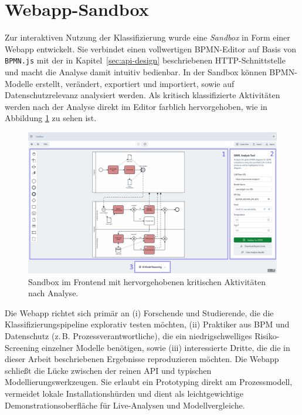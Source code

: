 \section{Webapp-Sandbox}\label{sec:nutzung-uber-webapp}

Zur interaktiven Nutzung der Klassifizierung wurde eine \emph{Sandbox} in Form einer Webapp entwickelt. Sie verbindet einen vollwertigen \ac{BPMN}-Editor auf Basis von \texttt{BPMN.js} \cite{bpmn-js} mit der in Kapitel~\ref{sec:api-design} beschriebenen HTTP-Schnittstelle und macht die Analyse damit intuitiv bedienbar. In der Sandbox können \ac{BPMN}-Modelle erstellt, verändert, exportiert und importiert, sowie auf Datenschutzrelevanz analysiert werden. Als kritisch klassifizierte Aktivitäten werden nach der Analyse direkt im Editor farblich hervorgehoben, wie in Abbildung \ref{fig:sandbox-frontend-analyzed-model} zu sehen ist.

\begin{figure}[h]
    \centering
    \includegraphics[width=\linewidth]{images/sandbox/sandbox-analyzed-model-annotated}
    \caption{Sandbox im Frontend mit hervorgehobenen kritischen Aktivitäten nach Analyse.}
    \label{fig:sandbox-frontend-analyzed-model}
\end{figure}

Die Webapp richtet sich primär an (i) Forschende und Studierende, die die Klassifizierungspipeline explorativ testen möchten, (ii) Praktiker aus \ac{BPM} und Datenschutz (z.\,B. Prozessverantwortliche), die ein niedrigschwelliges Risiko-Screening einzelner Modelle benötigen, sowie (iii) interessierte Dritte, die die in dieser Arbeit beschriebenen Ergebnisse reproduzieren möchten. Die Webapp schließt die Lücke zwischen der reinen API und typischen Modellierungswerkzeugen. Sie erlaubt ein Prototyping direkt am Prozessmodell, vermeidet lokale Installationshürden und dient als leichtgewichtige Demonstrationsoberfläche für Live-Analysen und Modellvergleiche.

